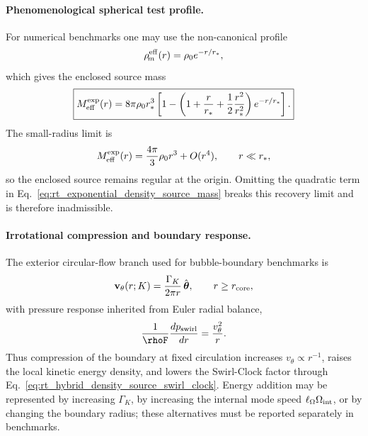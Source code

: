 \paragraph{Phenomenological spherical test profile.}
For numerical benchmarks one may use the non-canonical profile
\begin{equation}
\rho_{\!m}^{\rm eff}(r)=\rho_0 e^{-r/r_*},
\end{equation}
which gives the enclosed source mass
\begin{equation}
\boxed{
M_{\rm eff}^{\rm exp}(r)
=
8\pi\rho_0 r_*^3
\left[
1-
\left(
1+\frac{r}{r_*}
+\frac{1}{2}\frac{r^2}{r_*^2}
\right)e^{-r/r_*}
\right].
}
\label{eq:rt_exponential_density_source_mass}
\end{equation}
The small-radius limit is
\begin{equation}
M_{\rm eff}^{\rm exp}(r)
=
\frac{4\pi}{3}\rho_0 r^3+O(r^4),
\qquad r\ll r_*,
\end{equation}
so the enclosed source remains regular at the origin.  Omitting the quadratic
term in Eq.~\eqref{eq:rt_exponential_density_source_mass} breaks this recovery
limit and is therefore inadmissible.

\paragraph{Irrotational compression and boundary response.}
The exterior circular-flow branch used for bubble-boundary benchmarks is
\begin{equation}
\mathbf{v}_{\theta}(r;K)
=\frac{\Gamma_K}{2\pi r}\,\hat{\boldsymbol{\theta}},
\qquad r\ge r_{\rm core},
\label{eq:rt_irrotational_boundary_velocity}
\end{equation}
with pressure response inherited from Euler radial balance,
\begin{equation}
\frac{1}{\rhoF}\frac{dp_{\rm swirl}}{dr}
=\frac{v_{\theta}^{2}}{r}.
\label{eq:rt_boundary_pressure_balance}
\end{equation}
Thus compression of the boundary at fixed circulation increases
$v_{\theta}\propto r^{-1}$, raises the local kinetic energy density, and lowers
the Swirl-Clock factor through Eq.~\eqref{eq:rt_hybrid_density_source_swirl_clock}.
Energy addition may be represented by increasing $\Gamma_K$, by increasing the
internal mode speed $\ell_{\Omega}\Omega_{\rm int}$, or by changing the boundary
radius; these alternatives must be reported separately in benchmarks.

